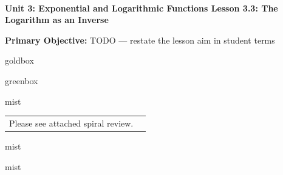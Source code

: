 \documentclass[10pt]{article}
\newcommand{\UnitNumberName}{Unit 3: Exponential and Logarithmic Functions \quad}
\newcommand{\LessonNumberName}{Lesson 3.3: The Logarithm as an Inverse}
\begin{document}
\begin{center}
    {\Large\bfseries \CourseName \\
    {\small\bfseries \UnitNumberName \LessonNumberName}}
\end{center}

\begin{tcolorbox}[colback=mist, colframe=royal, boxrule=0.9pt, arc=2mm,
    left=2mm, right=2mm, top=1.5mm, bottom=1.5mm]
    \textbf{Primary Objective:} TODO --- restate the lesson aim in student terms
\end{tcolorbox}

\renewcommand{\arraystretch}{1.6}
\begin{skillbox}{goldbox}
\end{skillbox}

\begin{skillbox}{greenbox}
\end{skillbox}

\begin{fixedskillbox}{mist}
    \begin{tabularx}{\linewidth}{@{}X c@{}}
        \begin{minipage}[t]{0.55\linewidth}\vspace{0pt}
            Please see attached spiral review.  %
        \end{minipage}
        &
        \begin{minipage}[t]{0.38\linewidth}\vspace{0pt}\centering
        \end{minipage}
    \end{tabularx}
\end{fixedskillbox}

\begin{skillbox}[Hook]{mist}
\end{skillbox}

\begin{skillbox}[Lesson]{mist}
\end{skillbox}
\end{document}
